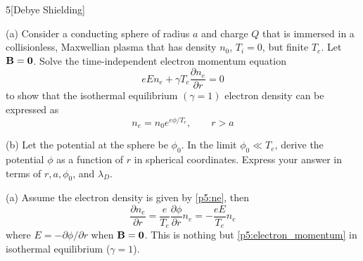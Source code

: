 \documentclass[12pt]{article}
\begin{document}
\begin{problem}{5}[Debye Shielding]
    
(a) Consider a conducting sphere of radius $a$ and charge $Q$ that is immersed
in a collisionless, Maxwellian plasma that has density $n_0$, $T_i=0$, but
finite $T_e$. Let $\vb{B}=\vb{0}$. Solve the time-independent electron momentum
equation
\begin{equation}\label{p5:electron_momentum}
    eEn_e+\gamma T_e\frac{\partial n_e}{\partial r}=0 
\end{equation}
to show that the isothermal equilibrium $(\gamma=1)$ electron density can be
expressed as
\begin{equation}\label{p5:ne}
    n_e=n_0e^{e\phi/T_e},\qquad r>a 
\end{equation}

(b) Let the potential at the sphere be $\phi_0$. In the limit $\phi_0\ll T_e$,
derive the potential $\phi$ as a function of $r$ in spherical coordinates.
Express your answer in terms of $r,a,\phi_0$, and $\lambda_D$.

\begin{solution}
    (a) Assume the electron density is given by \eqref{p5:ne}, then
    \begin{equation}
        \frac{\partial n_e}{\partial
        r}=\frac{e}{T_e}\frac{\partial\phi}{\partial r}n_e
        =-\frac{eE}{T_e}n_e
    \end{equation}
    where $E=-\partial\phi/\partial r$ when $\vb{B}=\vb{0}$. This is nothing but
    \eqref{p5:electron_momentum} in isothermal equilibrium ($\gamma=1$).


\end{solution}
\end{problem}
\end{document}
